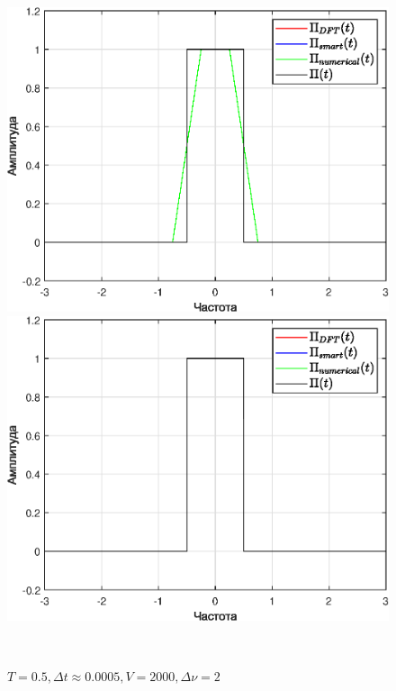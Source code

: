 \documentclass[a4paper]{article}
\begin{document}
\begin{figure}[H]
    \begin{minipage}{0.5\textwidth}
        \centering \includegraphics[width=\textwidth]{graphs/3/T_5000_dt_0.50005_V_2_dv_0.0002/func_combined_all.eps}
        \caption{$T = 5000, \Delta t \approx 0.5, V = 2, \Delta \nu = 0.0002$}
    \end{minipage}\hfill
    \begin{minipage}{0.5\textwidth}
        \centering \includegraphics[width=\textwidth]{graphs/3/T_0.5_dt_0.0005005_V_2000_dv_2/func_combined_all.eps}
        \caption{$T = 0.5, \Delta t \approx 0.0005, V = 2000, \Delta \nu = 2$}
    \end{minipage}\\[1em]
\end{figure}\noindent\
\end{document}
